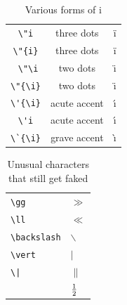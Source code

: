 ﻿\documentclass{article}
\begin{document}
\begin{table}
\begin{center}
\begin{tabular}{ccc}
\verb# \"i # & three dots & \"i \\
\verb#\"{i}#  & three dots & \"{i} \\
\verb# \"\i#  & two dots &  \"\i \\
\verb#\"{\i}#  & two dots &  \"{\i} \\
\verb#\'{\i}#  & acute accent &  \'{\i} \\
\verb#\'i#  & acute accent &  \'{\i} \\
\verb#\`{\i}#  & grave accent &  \`{\i} \\
\end{tabular}
\caption{Various forms of i}
\end{center}
\end{table}

\begin{table}
\begin{center}
\begin{tabular}{ll}
\verb#\gg# & $\gg$\\
\verb#\ll# & $\ll$\\
\verb#\backslash# & $\backslash$ \\
\verb#\vert# & $\vert$ \\
\verb#\|# & $\|$ \\
\verb#1\over2# & $1\over2$ 
\end{tabular}
\caption{Unusual characters that still get faked}
\end{center}
\end{table}
\end{document}
